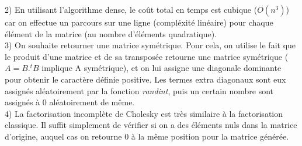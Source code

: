 \documentclass{article}
\begin{document}
    2) En utilisant l'algorithme dense, le coût total en temps est cubique ($O(n^3)$) car on effectue un parcours sur une ligne (compléxité linéaire) pour chaque élément de la matrice (au nombre d'éléments quadratique). \\

    
    3) On souhaite retourner une matrice symétrique. Pour cela, on utilise le fait que le produit d'une matrice et de sa transposée retourne une matrice symétrique ($A = B . ^tB$ implique A symétrique), et on lui assigne une diagonale dominante pour obtenir le caractère définie positive. Les termes extra diagonaux sont eux assignés aléatoirement par la fonction \textit{randint}, puis un certain nombre sont assignés à 0 aléatoirement de même. \\
    
  4) La factorisation incomplète de Cholesky est très similaire à la factorisation classique. Il suffit simplement de vérifier si on a des éléments nuls dans la matrice d'origine, auquel cas on retourne 0 à la même position pour la matrice générée. \\
  
\end{document}
